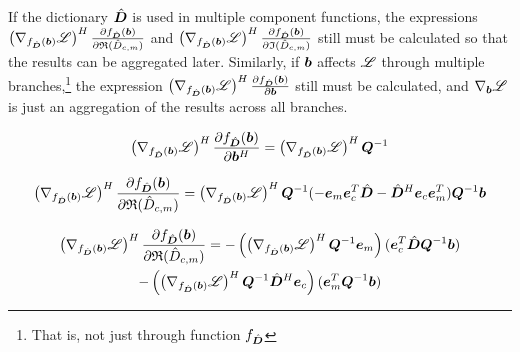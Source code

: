 \begin{appendices}
\sloppy If the dictionary $\hat{\bm{D}}$ is used in multiple component functions, the expressions $\left(\nabla_{f_{\hat{\bm{D}}}(\bm{b})} \mathscr{L}\right)^H\frac{\partial f_{\hat{\bm{D}}}(\bm{b})}{\partial \mathfrak{R}(\hat{D}_{c,m})}$ and $\left(\nabla_{f_{\hat{\bm{D}}}(\bm{b})} \mathscr{L}\right)^H\frac{\partial f_{\hat{\bm{D}}}(\bm{b})}{\partial \mathfrak{I}(\hat{D}_{c,m})}$ still must be calculated so that the results can be aggregated later. Similarly, if $\bm{b}$ affects $\mathscr{L}$ through multiple branches,\footnote{That is, not just through function $f_{\hat{\bm{D}}}$} the expression $\left(\nabla_{f_{\hat{\bm{D}}}(\bm{b})} \mathscr{L}\right)^H\frac{\partial f_{\hat{\bm{D}}}(\bm{b})}{\partial \bm{b}}$ still must be calculated, and $\nabla_{\bm{b}} \mathscr{L}$ is just an aggregation of the results across all branches.

\begin{equation}
\left(\nabla_{f_{\hat{\bm{D}}}(\bm{b})} \mathscr{L}\right)^H\frac{\partial f_{\hat{\bm{D}}}(\bm{b})}{\partial \bm{b}^H} =\left(\nabla_{f_{\hat{\bm{D}}}(\bm{b})} \mathscr{L}\right)^H\bm{Q}^{-1}
\end{equation}

\begin{equation}
\left(\nabla_{f_{\hat{\bm{D}}}(\bm{b})} \mathscr{L}\right)^H\frac{\partial f_{\hat{\bm{D}}}(\bm{b})}{\partial \mathfrak{R}(\hat{D}_{c,m})} = \left(\nabla_{f_{\hat{\bm{D}}}(\bm{b})} \mathscr{L}\right)^H\bm{Q}^{-1}(-\bm{e}_m\bm{e}_c^T\hat{\bm{D}} - \hat{\bm{D}}^H\bm{e}_c\bm{e}_m^T)\bm{Q}^{-1}\bm{b}
\end{equation}

\begin{multline}
\left(\nabla_{f_{\hat{\bm{D}}}(\bm{b})} \mathscr{L}\right)^H\frac{\partial f_{\hat{\bm{D}}}(\bm{b})}{\partial \mathfrak{R}(\hat{D}_{c,m})} = -\left(\left(\nabla_{f_{\hat{\bm{D}}}(\bm{b})} \mathscr{L}\right)^H\bm{Q}^{-1}\bm{e}_m\right)(\bm{e}_c^T\hat{\bm{D}}\bm{Q}^{-1}\bm{b}) \\- \left(\left(\nabla_{f_{\hat{\bm{D}}}(\bm{b})} \mathscr{L}\right)^H\bm{Q}^{-1}\hat{\bm{D}}^H\bm{e}_c\right)(\bm{e}_m^T\bm{Q}^{-1}\bm{b})
\end{multline}


\end{appendices}
